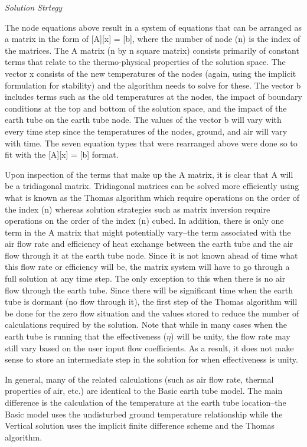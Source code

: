 \emph{\textit{Solution Strtegy}}

The node equations above result in a system of equations that can be arranged as a matrix in the form of [A][x] = [b], where the number of node (n) is the index of the matrices.  The A matrix (n by n square matrix) consists primarily of constant terms that relate to the thermo-physical properties of the solution space.  The vector x consists of the new temperatures of the nodes (again, using the implicit formulation for stability) and the algorithm needs to solve for these.  The vector b includes terms such as the old temperatures at the nodes, the impact of boundary conditions at the top and bottom of the solution space, and the impact of the earth tube on the earth tube node.  The values of the vector b will vary with every time step since the temperatures of the nodes, ground, and air will vary with time.  The seven equation types that were rearranged above were done so to fit with the [A][x] = [b] format.

Upon inspection of the terms that make up the A matrix, it is clear that A will be a tridiagonal matrix.  Tridiagonal matrices can be solved more efficiently using what is known as the Thomas algorithm which require operations on the order of the index (n) whereas solution strategies such as matrix inversion require operations on the order of the index (n) cubed.  In addition, there is only one term in the A matrix that might potentially vary--the term associated with the air flow rate and efficiency of heat exchange between the earth tube and the air flow through it at the earth tube node.  Since it is not known ahead of time what this flow rate or efficiency will be, the matrix system will have to go through a full solution at any time step.  The only exception to this when there is no air flow through the earth tube.  Since there will be significant time when the earth tube is dormant (no flow through it), the first step of the Thomas algorithm will be done for the zero flow situation and the values stored to reduce the number of calculations required by the solution.  Note that while in many cases when the earth tube is running that the effectiveness (\(\eta\)) will be unity, the flow rate may still vary based on the user input flow coefficients.  As a result, it does not make sense to store an intermediate step in the solution for when effectiveness is unity.

In general, many of the related calculations (such as air flow rate, thermal properties of air, etc.) are identical to the Basic earth tube model.  The main difference is the calculation of the temperature at the earth tube location--the Basic model uses the undisturbed ground temperature relationship while the Vertical solution uses the implicit finite difference scheme and the Thomas algorithm.

